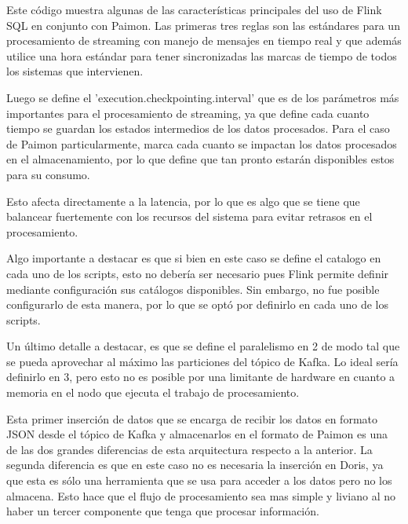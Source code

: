 Este código muestra algunas de las características principales del uso de Flink SQL en conjunto con Paimon.
Las primeras tres reglas son las estándares para un procesamiento de streaming 
con manejo de mensajes en tiempo real y que además utilice una hora estándar para tener sincronizadas
las marcas de tiempo de todos los sistemas que intervienen.\newline

Luego se define el 'execution.checkpointing.interval' que es de los parámetros más importantes para el procesamiento de streaming,
ya que define cada cuanto tiempo se guardan los estados intermedios de los datos procesados.
Para el caso de Paimon particularmente, marca cada cuanto se impactan los datos procesados en el almacenamiento,
por lo que define que tan pronto estarán disponibles estos para su consumo.\newline

Esto afecta directamente a la latencia, por lo que es algo que se tiene que balancear fuertemente con 
los recursos del sistema para evitar retrasos en el procesamiento.\newline

\newpage

Algo importante a destacar es que si bien en este caso se define el catalogo en cada uno de los scripts, 
esto no debería ser necesario pues Flink permite definir mediante configuración sus catálogos disponibles.
Sin embargo, no fue posible configurarlo de esta manera, por lo que se optó por definirlo en cada uno de los scripts.\newline

Un último detalle a destacar, es que se define el paralelismo en 2 de modo tal que se pueda aprovechar al máximo 
las particiones del tópico de Kafka. Lo ideal sería definirlo en 3, 
pero esto no es posible por una limitante de hardware en cuanto a memoria en el nodo que ejecuta el trabajo de procesamiento.\newline

Esta primer inserción de datos que se encarga de recibir los datos en formato JSON desde el tópico de Kafka
y almacenarlos en el formato de Paimon es una de las dos grandes diferencias de esta arquitectura respecto a la anterior.
La segunda diferencia es que en este caso no es necesaria la inserción en Doris, ya que esta es sólo una herramienta que se usa para acceder a los datos pero no los almacena. 
Esto hace que el flujo de procesamiento sea mas simple y liviano al no haber un tercer componente que tenga que procesar información. 